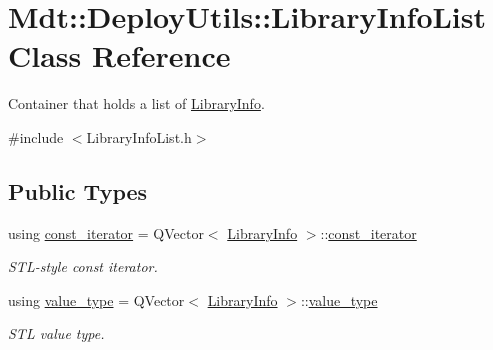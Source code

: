 \hypertarget{class_mdt_1_1_deploy_utils_1_1_library_info_list}{}\section{Mdt\+:\+:Deploy\+Utils\+:\+:Library\+Info\+List Class Reference}
\label{class_mdt_1_1_deploy_utils_1_1_library_info_list}


Container that holds a list of \hyperlink{class_mdt_1_1_deploy_utils_1_1_library_info}{Library\+Info}.  




{\ttfamily \#include $<$Library\+Info\+List.\+h$>$}

\subsection*{Public Types}
\begin{DoxyCompactItemize}
\item 
using \hyperlink{class_mdt_1_1_deploy_utils_1_1_library_info_list_a07338b20f243a1c7fcb3f696a35ddd44}{const\+\_\+iterator} = Q\+Vector$<$ \hyperlink{class_mdt_1_1_deploy_utils_1_1_library_info}{Library\+Info} $>$\+::\hyperlink{class_mdt_1_1_deploy_utils_1_1_library_info_list_a07338b20f243a1c7fcb3f696a35ddd44}{const\+\_\+iterator}
\begin{DoxyCompactList}\small\item\em S\+T\+L-\/style const iterator. \end{DoxyCompactList}\item 
using \hyperlink{class_mdt_1_1_deploy_utils_1_1_library_info_list_afcdf2c32ca02273dd257814517b691e8}{value\+\_\+type} = Q\+Vector$<$ \hyperlink{class_mdt_1_1_deploy_utils_1_1_library_info}{Library\+Info} $>$\+::\hyperlink{class_mdt_1_1_deploy_utils_1_1_library_info_list_afcdf2c32ca02273dd257814517b691e8}{value\+\_\+type}
\begin{DoxyCompactList}\small\item\em S\+TL value type. \end{DoxyCompactList}\end{DoxyCompactItemize}
